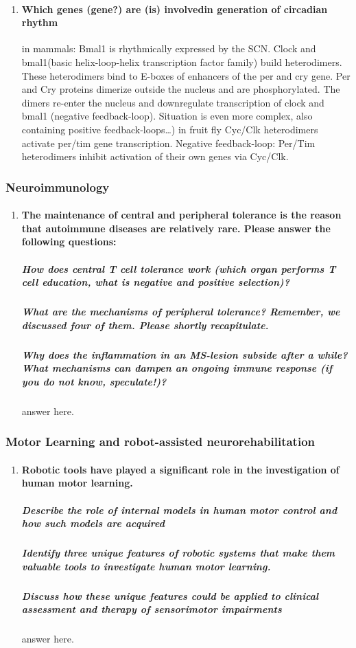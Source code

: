 \documentclass[12pt,article,oneside,a4paper]{memoir}
\begin{document}
\begin{enumerate}
\item \paragraph{Which genes (gene?) are (is) involvedin generation of circadian rhythm}

in mammals: Bmal1 is rhythmically expressed by the SCN. Clock and bmal1(basic helix-loop-helix transcription factor family) build heterodimers. These heterodimers bind to E-boxes of enhancers of the per and cry gene. Per and Cry proteins dimerize outside the nucleus and are phosphorylated. The dimers re-enter the nucleus and downregulate transcription of  clock and bmal1 (negative feedback-loop). Situation is even more complex, also containing positive feedback-loops…)
        in fruit fly Cyc/Clk heterodimers activate per/tim gene transcription. Negative feedback-loop: Per/Tim heterodimers inhibit activation of their own genes via Cyc/Clk.
\end{enumerate}

\subsubsection{Neuroimmunology}
\begin{enumerate}
\item \paragraph{The maintenance of central and peripheral tolerance is the reason that autoimmune diseases are relatively rare. Please answer the following questions:} \subparagraph{How does central T cell tolerance work (which organ performs T cell education, what is negative and positive selection)?} \subparagraph{What are the mechanisms of peripheral tolerance? Remember, we discussed four of them. Please shortly recapitulate.} \subparagraph{Why does the inflammation in an MS-lesion subside after a while? What mechanisms can dampen an ongoing immune response (if you do not know,
speculate!)?} answer here.
\end{enumerate}
\subsubsection{Motor Learning and robot-assisted neurorehabilitation}
\begin{enumerate}
\item \paragraph{Robotic tools have played a significant role in the investigation of human motor
learning.} \subparagraph{Describe the role of internal models in human motor control and how such
models are acquired} \subparagraph{Identify three unique features of robotic systems that make them valuable tools to investigate human motor learning.} \subparagraph{Discuss how these unique features could be applied to clinical assessment and therapy of sensorimotor impairments} answer here.
\end{enumerate}
\end{document}
